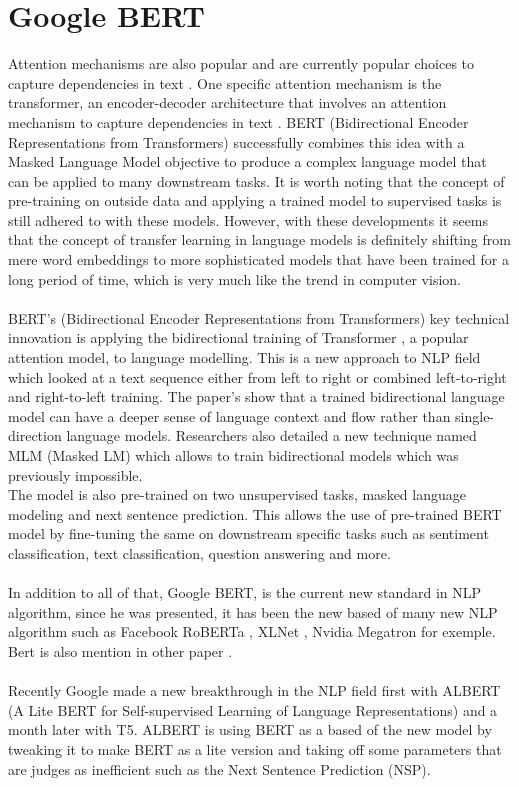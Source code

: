 \newpage
\section{Google BERT}
Attention mechanisms are also popular and are currently popular choices to capture dependencies in text \cite{Lin2017, Openai}. One specific attention mechanism is the transformer, an encoder-decoder architecture that involves an attention mechanism to capture dependencies in text \cite{Vaswani2017}. BERT (Bidirectional Encoder Representations from Transformers) \cite{Devlin2018} successfully combines this idea with a Masked Language Model objective to produce a complex language model that can be applied to many downstream tasks. It is worth noting that the concept of pre-training on outside data and applying a trained model to supervised tasks is still adhered to with these models. However, with these developments it seems that the concept of transfer learning in language models is definitely shifting from mere word embeddings to more sophisticated models that have been trained for a long period of time, which is very much like the trend in computer vision.\\
\\
BERT’s \cite{Devlin2018} (Bidirectional Encoder Representations from Transformers) key technical innovation is applying the bidirectional training of Transformer \cite{Vaswani2017}, a popular attention model, to language modelling. This is a new approach to NLP field which looked at a text sequence either from left to right or combined left-to-right and right-to-left training. The paper’s show that a trained bidirectional language model can have a deeper sense of language context and flow rather than single-direction language models. Researchers also detailed a new technique named MLM (Masked LM) which allows to train bidirectional models which was previously impossible. \\
The model is also pre-trained on two unsupervised tasks, masked language modeling and next sentence prediction. This allows the use of pre-trained BERT model by fine-tuning the same on downstream specific tasks such as sentiment classification, text classification, question answering and more.\\
\\
In addition to all of that, Google BERT, is the current new standard in NLP algorithm, since he was presented, it has been the new based of many new NLP algorithm such as Facebook RoBERTa \cite{Liu2019d}, XLNet \cite{Yang2019}, Nvidia Megatron \cite{Shoeybi} for exemple. Bert is also mention in other paper \cite{Zhu2019, Wang2019c}. \\ 
\\
Recently Google made a new breakthrough in the NLP field first with ALBERT (A Lite BERT for Self-supervised Learning of Language Representations) \cite{Lan} and a month later with T5\cite{Raffel2019}. ALBERT is using BERT as a based of the new model by tweaking it to make BERT as a lite version and taking off some parameters that are judges as inefficient such as the Next Sentence Prediction (NSP).

